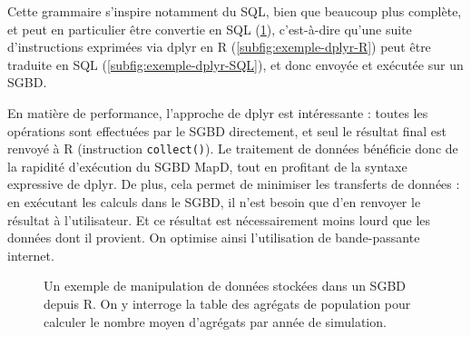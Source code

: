 Cette \og grammaire\fg{} s'inspire notamment du SQL, bien que beaucoup plus complète, et peut en particulier être \og convertie\fg{} en SQL (\cref{fig:dml-simedb}), c'est-à-dire qu'une suite d'instructions exprimées via \textsf{dplyr} en \textsf{R} (\cref{subfig:exemple-dplyr-R}) peut être traduite en SQL (\cref{subfig:exemple-dplyr-SQL}), et donc envoyée et exécutée sur un SGBD.

En matière de performance, l'approche de \textsf{dplyr} est intéressante : toutes les opérations sont effectuées par le SGBD directement, et seul le résultat final est renvoyé à \textsf{R} (instruction \texttt{collect()}).
Le traitement de données bénéficie donc de la rapidité d'exécution du SGBD MapD, tout en profitant de la syntaxe expressive de \textsf{dplyr}.
De plus, cela permet de minimiser les transferts de données : en exécutant les calculs dans le SGBD, il n'est besoin que d'en renvoyer le résultat à l'utilisateur.
Et ce résultat est nécessairement moins lourd que les données dont il provient.
On optimise ainsi l'utilisation de bande-passante internet.

\begin{figure}[H]
	\centering
	\hspace{5pt}
	\vspace{-0.3cm}
	\vspace{-0.3cm}
	\caption{Un exemple de manipulation de données stockées dans un SGBD depuis \textsf{R}. On y interroge la table des agrégats de population pour calculer le nombre moyen d'agrégats par année de simulation.}
	\label{fig:dml-simedb}
\end{figure}

